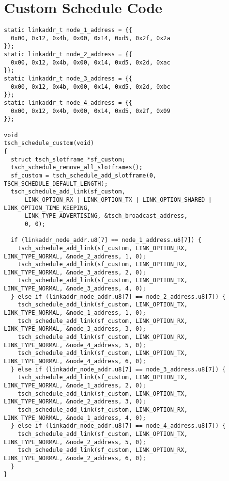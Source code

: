 \section{Custom Schedule Code\label{code:customsched}}

\begin{lstlisting}
static linkaddr_t node_1_address = {{
  0x00, 0x12, 0x4b, 0x00, 0x14, 0xd5, 0x2f, 0x2a
}};
static linkaddr_t node_2_address = {{
  0x00, 0x12, 0x4b, 0x00, 0x14, 0xd5, 0x2d, 0xac
}};
static linkaddr_t node_3_address = {{
  0x00, 0x12, 0x4b, 0x00, 0x14, 0xd5, 0x2d, 0xbc
}};
static linkaddr_t node_4_address = {{
  0x00, 0x12, 0x4b, 0x00, 0x14, 0xd5, 0x2f, 0x09
}};

void
tsch_schedule_custom(void)
{
  struct tsch_slotframe *sf_custom;
  tsch_schedule_remove_all_slotframes();
  sf_custom = tsch_schedule_add_slotframe(0, TSCH_SCHEDULE_DEFAULT_LENGTH);
  tsch_schedule_add_link(sf_custom,
      LINK_OPTION_RX | LINK_OPTION_TX | LINK_OPTION_SHARED | LINK_OPTION_TIME_KEEPING,
      LINK_TYPE_ADVERTISING, &tsch_broadcast_address,
      0, 0);

  if (linkaddr_node_addr.u8[7] == node_1_address.u8[7]) {
    tsch_schedule_add_link(sf_custom, LINK_OPTION_RX, LINK_TYPE_NORMAL, &node_2_address, 1, 0);
    tsch_schedule_add_link(sf_custom, LINK_OPTION_RX, LINK_TYPE_NORMAL, &node_3_address, 2, 0);
    tsch_schedule_add_link(sf_custom, LINK_OPTION_TX, LINK_TYPE_NORMAL, &node_3_address, 4, 0);
  } else if (linkaddr_node_addr.u8[7] == node_2_address.u8[7]) {
    tsch_schedule_add_link(sf_custom, LINK_OPTION_TX, LINK_TYPE_NORMAL, &node_1_address, 1, 0);
    tsch_schedule_add_link(sf_custom, LINK_OPTION_RX, LINK_TYPE_NORMAL, &node_3_address, 3, 0);
    tsch_schedule_add_link(sf_custom, LINK_OPTION_RX, LINK_TYPE_NORMAL, &node_4_address, 5, 0);
    tsch_schedule_add_link(sf_custom, LINK_OPTION_TX, LINK_TYPE_NORMAL, &node_4_address, 6, 0);
  } else if (linkaddr_node_addr.u8[7] == node_3_address.u8[7]) {
    tsch_schedule_add_link(sf_custom, LINK_OPTION_TX, LINK_TYPE_NORMAL, &node_1_address, 2, 0);
    tsch_schedule_add_link(sf_custom, LINK_OPTION_TX, LINK_TYPE_NORMAL, &node_2_address, 3, 0);
    tsch_schedule_add_link(sf_custom, LINK_OPTION_RX, LINK_TYPE_NORMAL, &node_1_address, 4, 0);
  } else if (linkaddr_node_addr.u8[7] == node_4_address.u8[7]) {
    tsch_schedule_add_link(sf_custom, LINK_OPTION_TX, LINK_TYPE_NORMAL, &node_2_address, 5, 0);
    tsch_schedule_add_link(sf_custom, LINK_OPTION_RX, LINK_TYPE_NORMAL, &node_2_address, 6, 0);
  }
}
\end{lstlisting}
